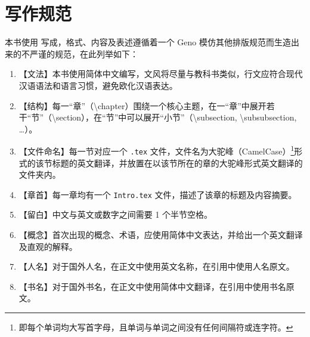 \section*{写作规范}\label{sec:Preface/WritingGuideline}
    本书使用  写成，格式、内容及表述遵循着一个 Geno 模仿其他排版规范而生造出来的不严谨的规范，在此列举如下：

    \begin{enumerate}
        \item 【文法】本书使用简体中文编写，文风将尽量与教科书类似，行文应符合现代汉语语法和语言习惯，避免欧化汉语表达。
        \item 【结构】每一“章”（\textbackslash chapter）围绕一个核心主题，在一“章”中展开若干“节”（\textbackslash section），在“节”中可以展开“小节”（\textbackslash subsection, \textbackslash subsubsection, \ldots）。
        \item 【文件命名】每一节对应一个 \texttt{.tex} 文件，文件名为大驼峰（CamelCase）\footnote{即每个单词均大写首字母，且单词与单词之间没有任何间隔符或连字符。}形式的该节标题的英文翻译，并放置在以该节所在的章的大驼峰形式英文翻译的文件夹内。
        \item 【章首】每一章均有一个 \texttt{Intro.tex} 文件，描述了该章的标题及内容摘要。
        \item 【留白】中文与英文或数字之间需要 1 个半节空格。
        \item 【概念】首次出现的概念、术语，应使用简体中文表达，并给出一个英文翻译及直观的解释。
        \item 【人名】对于国外人名，在正文中使用英文名称，在引用中使用人名原文。
        \item 【书名】对于国外书名，在正文中使用简体中文翻译，在引用中使用书名原文。
    \end{enumerate}
